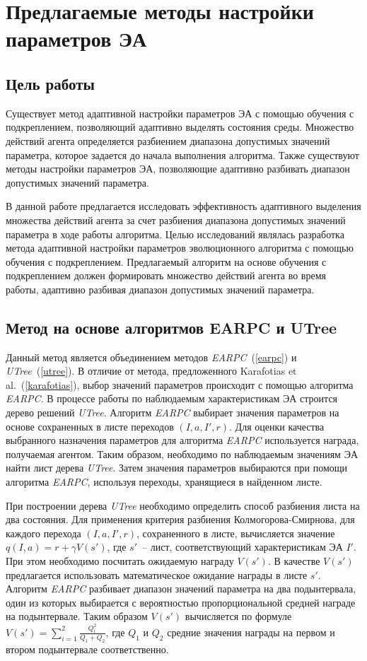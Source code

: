 \chapter{Предлагаемые методы настройки параметров ЭА}
\label{proposed_chapter}
\section{Цель работы}
Существует метод адаптивной настройки параметров ЭА с помощью обучения с подкреплением, позволяющий адаптивно выделять состояния среды. Множество действий агента определяется разбиением диапазона допустимых значений параметра, которое задается до начала выполнения алгоритма. Также существуют методы настройки параметров ЭА, позволяющие адаптивно разбивать диапазон допустимых значений параметра.

В данной работе предлагается исследовать эффективность адаптивного выделения множества действий агента за счет разбиения диапазона допустимых значений параметра в ходе работы алгоритма. Целью исследований являлась разработка метода адаптивной настройки параметров эволюционного алгоритма с помощью обучения с подкреплением. Предлагаемый алгоритм на основе обучения с подкреплением должен формировать множество действий агента во время работы, адаптивно разбивая диапазон допустимых значений параметра.

\section{Метод на основе алгоритмов EARPC и UTree}
\label{composing_method}
Данный метод является объединением методов \textit{EARPC}~(\ref{earpc}) и \textit{UTree}~(\ref{utree}). В отличие от метода, предложенного Karafotias et al.~(\ref{karafotias}), выбор значений параметров происходит с помощью алгоритма \textit{EARPC}. В процессе работы по наблюдаемым характеристикам ЭА строится дерево решений \textit{UTree}. Алгоритм \textit{EARPC} выбирает значения параметров на основе сохраненных в листе переходов $(I, a, I', r)$. Для оценки качества выбранного назначения параметров для алгоритма \textit{EARPC} используется награда, получаемая агентом. Таким образом, необходимо по наблюдаемым значениям ЭА найти лист дерева \textit{UTree}. Затем значения параметров выбираются при помощи алгоритма \textit{EARPC}, используя переходы, хранящиеся в найденном листе.

При построении дерева \textit{UTree} необходимо определить способ разбиения листа на два состояния. Для применения критерия разбиения Колмогорова-Смирнова, для каждого перехода $(I, a, I', r)$, сохраненного в листе, вычисляется значение $q(I, a) = r + \gamma V(s')$, где $s'$~-- лист, соответствующий характеристикам ЭА $I'$. При этом необходимо посчитать ожидаемую награду $V(s')$. В качестве $V(s')$ предлагается использовать математическое ожидание награды в листе $s'$. Алгоритм \textit{EARPC} разбивает диапазон значений параметра на два подынтервала, один из которых выбирается с вероятностью пропорциональной средней награде на подынтервале. Таким образом $V(s')$ вычисляется по формуле $V(s') = \sum\limits_{i = 1}^2{\frac{Q_i^2}{Q_1 + Q_2}}$, где $Q_1$ и $Q_2$ средние значения награды на первом и втором подынтервале соответственно. 

